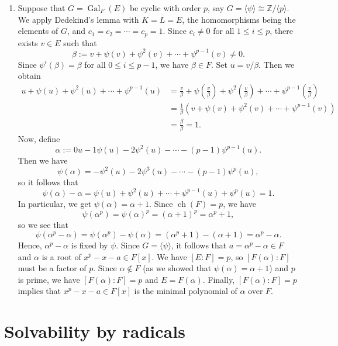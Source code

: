 \documentclass[10pt]{article}
\makeatletter
\newcommand{\Z}{\mathbb{Z}}
\DeclareMathOperator{\ch}{ch}
\DeclareMathOperator{\Gal}{Gal}
\theoremstyle{newstyle}
\newenvironment{pf}[1][\proofname]{\par
  \pushQED{\qed}%
  \normalfont \topsep0\p@\relax
  \trivlist
  \item[\hskip\labelsep\scshape
  #1\@addpunct{.}]\ignorespaces
}{%
  \popQED\endtrivlist\@endpefalse
}
\makeatother
\begin{document}
\begin{pf}
\begin{enumerate}[(1)]
    \item Suppose that $G = \Gal_F(E)$ be cyclic with order $p$, say $G = \langle \psi \rangle 
    \cong \Z/\langle p \rangle$. We apply Dedekind's lemma with $K = L = E$, 
    the homomorphisms being the elements of $G$, and $c_1 = c_2 = \cdots = c_p = 1$. 
    Since $c_i \neq 0$ for all $1 \leq i \leq p$, there exists $v \in E$ such that 
    \[ \beta := v + \psi(v) + \psi^2(v) + \cdots + \psi^{p-1}(v) \neq 0. \]
    Since $\psi^i(\beta) = \beta$ for all $0 \leq i \leq p-1$, we have $\beta \in F$. 
    Set $u = v/\beta$. Then we obtain 
    \begin{align*}
        u + \psi(u) + \psi^2(u) + \cdots + \psi^{p-1}(u)
        &= \frac v\beta + \psi\left(\frac v\beta\right) + \psi^2\left( \frac v\beta\right)
        + \cdots + \psi^{p-1}\left(\frac v\beta\right) \\
        &= \frac1\beta (v + \psi(v) + \psi^2(v) + \cdots + \psi^{p-1}(v)) \\
        &= \frac\beta\beta = 1.
    \end{align*}
    Now, define
    \[ \alpha := 0u - 1\psi(u) - 2\psi^2(u) - \cdots - (p-1)\psi^{p-1}(u). \]
    Then we have 
    \[ \psi(\alpha) = -\psi^2(u) - 2\psi^3(u) - \cdots - (p-1)\psi^p(u), \]
    so it follows that 
    \[ \psi(\alpha) - \alpha = \psi(u) + \psi^2(u) + \cdots + \psi^{p-1}(u) + \psi^p(u) = 1. \]
    In particular, we get $\psi(\alpha) = \alpha+1$. Since $\ch(F) = p$, we have 
    \[ \psi(\alpha^p) = \psi(\alpha)^p = (\alpha+1)^p = \alpha^p + 1, \]
    so we see that 
    \[ \psi(\alpha^p - \alpha) = \psi(\alpha^p) - \psi(\alpha) = (\alpha^p+1) - (\alpha+1) = \alpha^p 
    - \alpha. \]
    Hence, $\alpha^p - \alpha$ is fixed by $\psi$. Since $G = \langle \psi \rangle$, it follows that 
    $a = \alpha^p - \alpha \in F$ and $\alpha$ is a root of $x^p - x - a \in F[x]$. We have 
    $[E : F] = p$, so $[F(\alpha) : F]$ must be a factor of $p$. Since 
    $\alpha \notin F$ (as we showed that $\psi(\alpha) = \alpha+1$) and $p$ is prime, we have 
    $[F(\alpha) : F] = p$ and $E = F(\alpha)$. Finally, $[F(\alpha) : F] = p$ implies that 
    $x^p - x - a \in F[x]$ is the minimal polynomial of $\alpha$ over $F$. \qedhere 
\end{enumerate}
\end{pf}

\newpage 
\section{Solvability by radicals}
\end{document}
